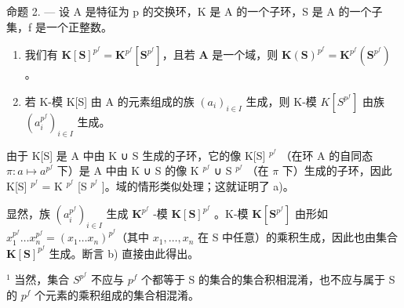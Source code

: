 命题 2. --- 设 A 是特征为 p 的交换环，K 是 A 的一个子环，S 是 A 的一个子集，f 是一个正整数。

\begin{enumerate}
\def\labelenumi{\alph{enumi})}
\item
  我们有 \(\mathbf{K}[\mathbf{S}]^{p^f} = \mathbf{K}^{p^f}[\mathbf{S}^{p^f}]\)，且若 \(\mathbf{A}\) 是一个域，则 \(\mathbf{K}(\mathbf{S})^{p^f} = \mathbf{K}^{p^f}(\mathbf{S}^{p^f})\) 。
\item
  若 K-模 K{[}S{]} 由 A 的元素组成的族 \((a_{i})_{i\in I}\) 生成，则 K-模 \(K[S^{p^{f}}]\) 由族 \((a_{i}^{p^{f}})_{i\in I}\) 生成。
\end{enumerate}

由于 K{[}S{]} 是 A 中由 K ∪ S 生成的子环，它的像 K{[}S{]} \(^{p^{f}}\) （在环 A 的自同态 \(\pi: a \mapsto a^{p^{f}}\) 下）是 A 中由 K ∪ S 的像 K \(^{p^{f}}\) ∪ S \(^{p^{f}}\) （在 \(\pi\) 下）生成的子环，因此 K{[}S{]} \(^{p^{f}}\) = K \(^{p^{f}}\) {[}S \(^{p^{f}}\) {]}。域的情形类似处理；这就证明了 a)。

显然，族 \((a_i^{p^f})_{i\in I}\) 生成 \(\mathbf{K}^{p^f}\) -模 \(\mathbf{K}[\mathbf{S}]^{p^f}\) 。K-模 \(\mathbf{K}[\mathbf{S}^{p^f}]\) 由形如 \(x_1^{p^f}\ldots x_n^{p^f} = (x_1\ldots x_n)^{p^f}\)（其中 \(x_1,\ldots ,x_n\) 在 S 中任意）的乘积生成，因此也由集合 \(\mathbf{K}[\mathbf{S}]^{p^f}\) 生成。断言 b) 直接由此得出。

\(^{1}\) 当然，集合 \(S^{p^{f}}\) 不应与 \(p^{f}\) 个都等于 S 的集合的集合积相混淆，也不应与属于 S 的 \(p^{f}\) 个元素的乘积组成的集合相混淆。

